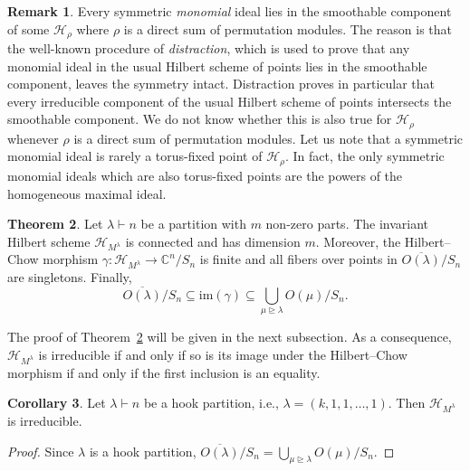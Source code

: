 \documentclass[11pt]{amsart}
\theoremstyle{definition}
\newtheorem{theorem}{Theorem}[section]
\newtheorem{corollary}[theorem]{Corollary}
\newtheorem{remark}[theorem]{Remark}
\newcommand{\CC}{\mathbb{C}}
\newcommand{\HH}{\mathcal{H}}
\begin{document}
\begin{remark}
    Every symmetric \emph{monomial} ideal lies in the smoothable component of some $\HH_\rho$ where $\rho$ is a direct sum of permutation modules. The reason is that the well-known procedure of \emph{distraction}, which is used to prove that any monomial ideal in the usual Hilbert scheme of points lies in the smoothable component, leaves the symmetry intact. Distraction proves in particular that every irreducible component of the usual Hilbert scheme of points intersects the smoothable component. We do not know whether this is also true for $\HH_\rho$ whenever $\rho$ is a direct sum of permutation modules. Let us note that a symmetric monomial ideal is rarely a torus-fixed point of $\HH_\rho$. In fact, the only symmetric monomial ideals which are also torus-fixed points are the powers of the homogeneous maximal ideal.
\end{remark}

\begin{theorem}\label{thm:singleOrbit}
    Let $\lambda \vdash n$ be a partition with $m$ non-zero parts. The invariant Hilbert scheme $\HH_{M^\lambda}$ is connected and has dimension $m$. Moreover, the Hilbert--Chow morphism $\gamma \colon \HH_{M^\lambda} \longrightarrow \CC^n/S_n$ is finite and all fibers over points in $\overline{O(\lambda)}/S_n$ are singletons. Finally,
    \begin{equation*}
        \overline{O(\lambda)}/S_n \subseteq \mathrm{im}(\gamma) \subseteq \bigcup_{\mu \trianglerighteq \lambda} O(\mu)/S_n.
    \end{equation*}
\end{theorem}

The proof of Theorem~\ref{thm:singleOrbit} will be given in the next subsection. As a consequence, $\HH_{M^\lambda}$ is irreducible if and only if so is its image under the Hilbert--Chow morphism if and only if the first inclusion is an equality.

\begin{corollary}\label{corollary:hookPartition}
    Let $\lambda \vdash n$ be a hook partition, i.e., $\lambda = (k,1,1,\ldots,1)$. Then $\HH_{M^\lambda}$ is irreducible.
\end{corollary}

\begin{proof}
    Since $\lambda$ is a hook partition, $\overline{O(\lambda)}/S_n = \bigcup_{\mu \trianglerighteq \lambda} O(\mu)/S_n$.
\end{proof}
\end{document}
